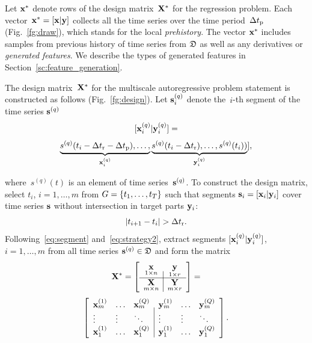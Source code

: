 \documentclass[conference]{IEEEtran}
\begin{document}
Let ${\mathbf{x}}^{*}$ denote rows of the design matrix~${\mathbf{X}}^*$ for the regression problem. Each vector~${\mathbf{x}}^{*} = [{\mathbf{x}}| {\mathbf{y}}]$ collects all the time series over the time period~$\Delta t_\text{p}$ (Fig.~\ref{fg:draw}), which stands for the local \emph{prehistory}. The vector ${\mathbf{x}}^{*}$ includes samples from previous history of time series from ${\mathfrak{D}}$ as well as any derivatives or \emph{generated features}. We describe the types of generated features in Section~\ref{sc:feature_generation}.

The design matrix~${\mathbf{X}}^*$ for the multiscale autoregressive problem statement is constructed  as follows (Fig.~\ref{fg:design}). Let ${\mathbf{s}}^{(q)}_i$ denote the~$i$-th segment of the time series ${\mathbf{s}}^{(q)}$
\begin{equation}\label{eq:segment}
[\bx^{(q)}_i | \by^{(q)}_i] = \end{equation}
\[ \underbrace{s^{(q)}(t_i-\Delta t_\text{r}-\Delta t_\text{p}),\dots,}_{{\mathbf{x}}^{(q)}_i} \underbrace{s^{(q)}(t_i-\Delta t_\text{r}),\dots,s^{(q)}(t_i))}_{{\mathbf{y}}^{(q)}_i}], \]

where~$s^{(q)}(t)$ is an element of time series~${\mathbf{s}}^{(q)}$. To construct the design matrix, select $t_i$, $i = 1, \dots, m$ from $G = \{t_1, \dots, t_T\}$ such that segments ${\mathbf{s}}_i = [{\mathbf{x}}_i|{\mathbf{y}}_i]$ cover time series ${\mathbf{s}}$
without intersection in target parts  ${\mathbf{y}}_i$:
\begin{equation}\label{eq:strategy2} |t_{i+1} - t_i| > \dtr.
\end{equation}
Following~\eqref{eq:segment} and~\eqref{eq:strategy2}, extract segments $[{\mathbf{x}}^{(q)}_i | {\mathbf{y}}^{(q)}_i]$, $i = 1, \dots, m$ from all time series ${\mathbf{s}}^{(q)} \in {\mathfrak{D}}$ and form the matrix
 \begin{equation}\label{eq:design_matrix}
\bX^*= \left[
\begin{array}{c|c}
\underset{1{\times}n}{\x} & \underset{1{\times}r}{{\by}}  \\
\hline
 \underset{m{\times}n}\bX & \underset{m{\times}r}\bY  \\
 \end{array}
\right] = \end{equation}
\[ \left[
\begin{array}{lll|lll}
{\mathbf{x}}_m^{(1)}  & \dots & {\mathbf{x}}_m^{(Q)} & {\mathbf{y}}_m^{(1)} &  \dots & {\mathbf{y}}_m^{(Q)}   \\
\vdots & \vdots & \ddots & \vdots & \vdots & \ddots  \\
{\mathbf{x}}_1^{(1)} & \dots & {\mathbf{x}}_1^{(Q)} & {\mathbf{y}}_1^{(1)}  & \dots & {\mathbf{y}}_1^{(Q)}   \\


\end{array}
\right]. \]
\end{document}
